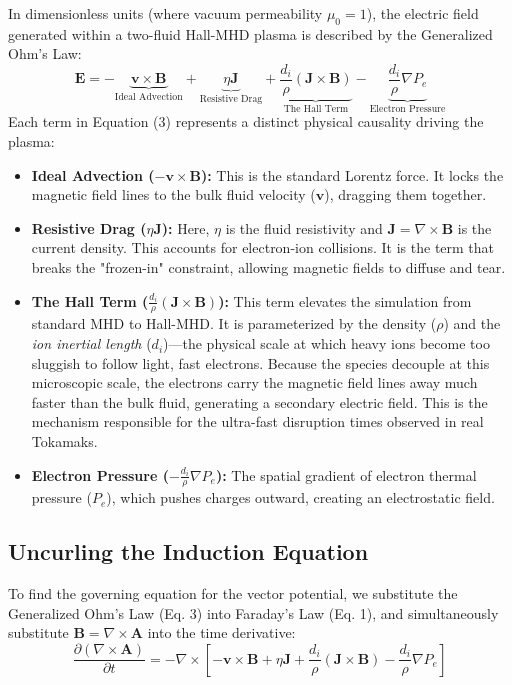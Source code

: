 \documentclass[11pt, a4paper]{article}
\begin{document}
In dimensionless units (where vacuum permeability $\mu_0 = 1$), the electric field generated within a two-fluid Hall-MHD plasma is described by the Generalized Ohm's Law:
\begin{equation}
    \mathbf{E} = -\underbrace{\mathbf{v} \times \mathbf{B}}_{\text{Ideal Advection}} + \underbrace{\eta \mathbf{J}}_{\text{Resistive Drag}} + \underbrace{\frac{d_i}{\rho}(\mathbf{J} \times \mathbf{B})}_{\text{The Hall Term}} - \underbrace{\frac{d_i}{\rho} \nabla P_e}_{\text{Electron Pressure}}
\end{equation}
Each term in Equation (3) represents a distinct physical causality driving the plasma:
\begin{itemize}
    \item \textbf{Ideal Advection ($-\mathbf{v} \times \mathbf{B}$):} This is the standard Lorentz force. It locks the magnetic field lines to the bulk fluid velocity ($\mathbf{v}$), dragging them together.
    \item \textbf{Resistive Drag ($\eta \mathbf{J}$):} Here, $\eta$ is the fluid resistivity and $\mathbf{J} = \nabla \times \mathbf{B}$ is the current density. This accounts for electron-ion collisions. It is the term that breaks the "frozen-in" constraint, allowing magnetic fields to diffuse and tear.
    \item \textbf{The Hall Term ($\frac{d_i}{\rho}(\mathbf{J} \times \mathbf{B})$):} This term elevates the simulation from standard MHD to Hall-MHD. It is parameterized by the density ($\rho$) and the \textit{ion inertial length} ($d_i$)—the physical scale at which heavy ions become too sluggish to follow light, fast electrons. Because the species decouple at this microscopic scale, the electrons carry the magnetic field lines away much faster than the bulk fluid, generating a secondary electric field. This is the mechanism responsible for the ultra-fast disruption times observed in real Tokamaks.
    \item \textbf{Electron Pressure ($-\frac{d_i}{\rho} \nabla P_e$):} The spatial gradient of electron thermal pressure ($P_e$), which pushes charges outward, creating an electrostatic field.
\end{itemize}

\subsection{Uncurling the Induction Equation}
To find the governing equation for the vector potential, we substitute the Generalized Ohm's Law (Eq. 3) into Faraday's Law (Eq. 1), and simultaneously substitute $\mathbf{B} = \nabla \times \mathbf{A}$ into the time derivative:
\begin{equation}
    \frac{\partial (\nabla \times \mathbf{A})}{\partial t} = -\nabla \times \left[ -\mathbf{v} \times \mathbf{B} + \eta \mathbf{J} + \frac{d_i}{\rho}(\mathbf{J} \times \mathbf{B}) - \frac{d_i}{\rho} \nabla P_e \right]
\end{equation}
\end{document}
